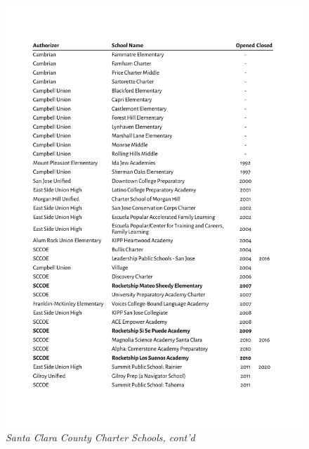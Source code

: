\begin{figure}[htb]
  \caption*{\textit{Santa Clara County Charter Schools, cont'd}}
  \includegraphics[page=2,width=\textwidth]{Santa_Clara_County_Charter_Schools}
\end{figure}

